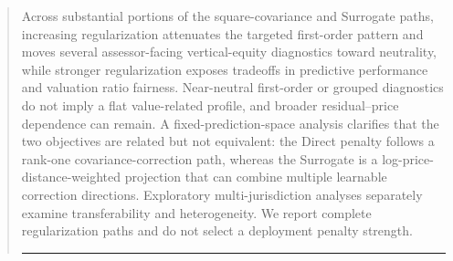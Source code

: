\documentclass[10pt]{article}
\theoremstyle{definition}
\newcommand{\1}{\mathbf{1}}
\begin{document}
\begin{abstract}
{Across substantial portions of the square-covariance and Surrogate paths, increasing regularization attenuates the targeted first-order pattern and moves several assessor-facing vertical-equity diagnostics toward neutrality, while stronger regularization exposes tradeoffs in predictive performance and valuation ratio fairness. Near-neutral first-order or grouped diagnostics do not imply a flat value-related profile, and broader residual--price dependence can remain.}
{A fixed-prediction-space analysis clarifies that the two objectives are related but not equivalent: the Direct penalty follows a rank-one covariance-correction path, whereas the Surrogate is a log-price-distance-weighted projection that can combine multiple learnable correction directions. Exploratory multi-jurisdiction analyses separately examine transferability and heterogeneity. We report complete regularization paths and do not select a deployment penalty strength.}

\hrule 






\end{abstract}
\end{document}
